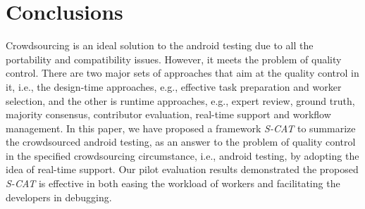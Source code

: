 \documentclass[10pt,conference]{IEEEtran}
\begin{document}
\section{Conclusions}\label{conclusions}


Crowdsourcing is an ideal solution to the android testing due to all the portability and compatibility issues. However, it meets the problem of quality control.
There are two major sets of approaches that aim at the quality control in it, i.e., the design-time approaches, e.g.,
effective task preparation and worker selection, and the other is runtime approaches, e.g., expert review, ground truth, majority consensus, contributor evaluation,
real-time support and workflow management.
In this paper, we have proposed a framework \emph{S-CAT} to summarize the crowdsourced android testing, as an answer to the problem of
quality control in the specified crowdsourcing circumstance, i.e., android testing, by adopting the idea of real-time support. Our pilot evaluation results demonstrated
the proposed \emph{S-CAT} is effective in both easing the workload of workers and facilitating the developers in debugging.




%
%

\end{document}
